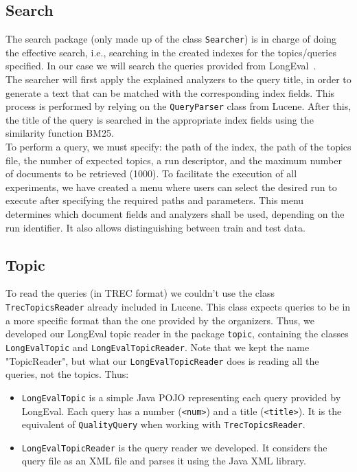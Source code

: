 \subsection{Search}\label{subsec:search}
The search package (only made up of the class \texttt{Searcher}) is in charge of doing the effective search, i.e.,
searching in the created indexes for the topics/queries specified.
In our case we will search the queries provided from LongEval~\cite{traindata}.\\

The searcher will first apply the explained analyzers to the query title, in order to generate a text that can be
matched with the corresponding index fields.
This process is performed by relying on the \texttt{QueryParser} class from Lucene.
After this, the title of the query is searched in the appropriate index fields using the similarity function
BM25.\\

To perform a query, we must specify: the path of the index, the path of the topics file, the number of expected topics,
a run descriptor, and the maximum number of documents to be retrieved (1000).
To facilitate the execution of all experiments, we have created a menu where users can select the desired run to execute
after specifying the required paths and parameters.
This menu determines which document fields and analyzers shall be used, depending on the run identifier.
It also allows distinguishing between train and test data.\\

\subsection{Topic}\label{subsec:topic}

To read the queries (in TREC format) we couldn't use the class \texttt{TrecTopicsReader} already included in Lucene.
This class expects queries to be in a more specific format than the one provided by the organizers.
Thus, we developed our LongEval topic reader in the package \texttt{topic}, containing the classes
\texttt{LongEvalTopic} and \texttt{LongEvalTopicReader}.
Note that we kept the name "TopicReader", but what our \texttt{LongEvalTopicReader} does is reading all the queries,
not the topics.
Thus:
\begin{itemize}
    \item \texttt{LongEvalTopic} is a simple Java POJO representing each query provided by LongEval.
          Each query has a number (\texttt{<num>}) and a title (\texttt{<title>}).
          It is the equivalent of \texttt{QualityQuery} when working with \texttt{TrecTopicsReader}.
    \item \texttt{LongEvalTopicReader} is the query reader we developed.
          It considers the query file as an XML file and parses it using the Java XML library.
\end{itemize}